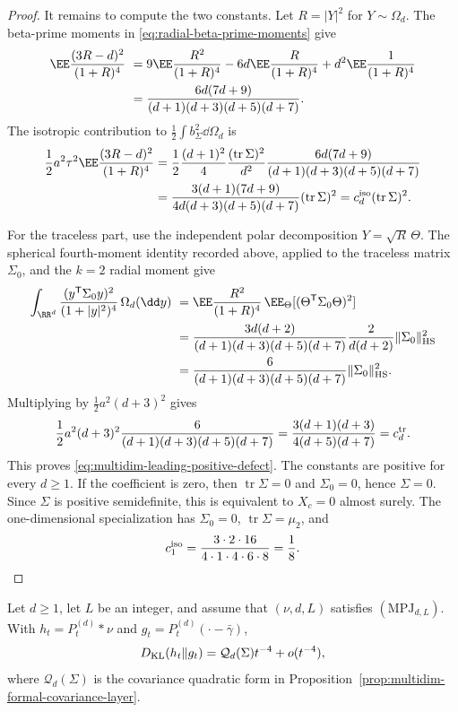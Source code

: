 \begin{proof}
It remains to compute the two constants.  Let \(R=|Y|^2\) for
\(Y\sim\Omega_d\).  The beta-prime moments in
\eqref{eq:radial-beta-prime-moments} give
\[
\begin{split}
\EE\frac{(3R-d)^2}{(1+R)^4}
\ &=
9\EE\frac{R^2}{(1+R)^4}
-6d\EE\frac{R}{(1+R)^4}
+d^2\EE\frac1{(1+R)^4}\\
\ &=
\frac{6d(7d+9)}
{(d+1)(d+3)(d+5)(d+7)}.
\end{split}
\]
The isotropic contribution to \(\frac12\int b_\Sigma^2\dd\Omega_d\) is
\[
\begin{aligned}
\frac12 a^2\tau^2
\EE\frac{(3R-d)^2}{(1+R)^4}
&=
\frac12\frac{(d+1)^2}{4}
\frac{(\operatorname{tr}\Sigma)^2}{d^2}
\frac{6d(7d+9)}
{(d+1)(d+3)(d+5)(d+7)}\\
&=
\frac{3(d+1)(7d+9)}
{4d(d+3)(d+5)(d+7)}
(\operatorname{tr}\Sigma)^2
=c_d^{\rm iso}(\operatorname{tr}\Sigma)^2 .
\end{aligned}
\]

For the traceless part, use the independent polar decomposition
\(Y=\sqrt R\,\Theta\).  The spherical fourth-moment identity recorded above,
applied to the traceless matrix \(\Sigma_0\), and the \(k=2\) radial moment
give
\[
\begin{split}
\int_{\RR^d}
\frac{(y^{\mathsf T}\Sigma_0y)^2}{(1+|y|^2)^4}\,\Omega_d(\dd y)
\ &=
\EE\frac{R^2}{(1+R)^4}\,
\EE_\Theta[(\Theta^{\mathsf T}\Sigma_0\Theta)^2]\\
\ &=
\frac{3d(d+2)}{(d+1)(d+3)(d+5)(d+7)}
\frac{2}{d(d+2)}
\|\Sigma_0\|_{\rm HS}^2\\
\ &=
\frac{6}{(d+1)(d+3)(d+5)(d+7)}
\|\Sigma_0\|_{\rm HS}^2.
\end{split}
\]
Multiplying by \(\frac12a^2(d+3)^2\) gives
\[
\frac12a^2(d+3)^2
\frac{6}{(d+1)(d+3)(d+5)(d+7)}
=
\frac{3(d+1)(d+3)}{4(d+5)(d+7)}
=c_d^{\rm tr}.
\]
This proves \eqref{eq:multidim-leading-positive-defect}.
The constants are positive for every \(d\ge1\).  If the coefficient is zero,
then \(\operatorname{tr}\Sigma=0\) and \(\Sigma_0=0\), hence
\(\Sigma=0\).  Since \(\Sigma\) is positive semidefinite, this is equivalent
to \(X_c=0\) almost surely.  The one-dimensional specialization has
\(\Sigma_0=0\), \(\operatorname{tr}\Sigma=\mu_2\), and
\[
c_1^{\rm iso}
=\frac{3\cdot2\cdot16}{4\cdot1\cdot4\cdot6\cdot8}
=\frac18 .
\]
\end{proof}

\begin{corollary}%
\label{cor:multidim-leading-kl-coefficient}
Let \(d\ge1\), let \(L\) be an integer, and assume that
\((\nu,d,L)\) satisfies \((\mathrm{MPJ}_{d,L})\).  With
\(h_t=P_t^{(d)}*\nu\) and
\(g_t=P_t^{(d)}(\cdot-\bar{\gamma})\),
\[
D_{\rm KL}(h_t\|g_t)
=\mathcal Q_d(\Sigma)t^{-4}+o(t^{-4}),
\]
where \(\mathcal Q_d(\Sigma)\) is the covariance quadratic form in
Proposition~\ref{prop:multidim-formal-covariance-layer}.
\end{corollary}

